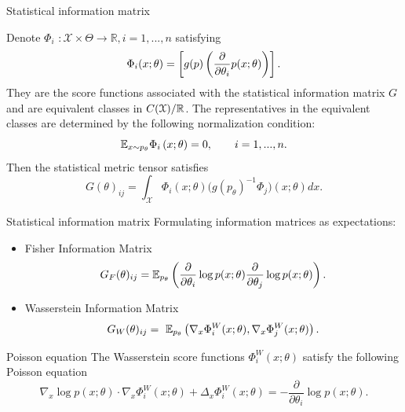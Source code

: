\documentclass{beamer}
\begin{document}
\begin{frame}{Statistical information matrix}

    \begin{definition}
Denote $\Phi_i$ $\colon \mathcal{X}\times\Theta\rightarrow \mathbb{R}, i = 1,...,n $ satisfying
$$\Phi_i(x;\theta)= \left[ g(p) \left( \frac{\partial}{\partial \theta_i}p(x;\theta) \right) \right] .$$
They are the score functions associated with the statistical information matrix $G$ and are equivalent classes in $C(\mathcal{X})/\mathbb{R}$. The representatives in the equivalent classes are determined by the following normalization condition:
\begin{equation*}\label{normalization}
    \mathbb{E}_{x \sim p_\theta} \Phi_i\left( x; \theta \right) = 0,\qquad i = 1,...,n.
\end{equation*}
Then the statistical metric tensor satisfies  
\begin{equation*}
G(\theta)_{ij}=\int_{\mathcal{X}} \Phi_i(x;\theta)\Big(g(p_\theta)^{-1}\Phi_j\Big)(x;\theta)dx.
\end{equation*}
\end{definition}
\end{frame}

\begin{frame}{Statistical information matrix}
    Formulating information matrices as expectations:
    \begin{itemize}
        \item Fisher Information Matrix
        \begin{equation*}
\begin{split}
G_F(\theta)_{ij}= \mathbb{E}_{p_\theta}\left( \frac{\partial}{\partial \theta_i}\log p(x;\theta)\frac{\partial}{\partial \theta_j}\log p(x;\theta) \right).
\end{split}
\end{equation*}
        \item Wasserstein Information Matrix
        \begin{equation*}
\begin{split}
G_W(\theta)_{ij}=\ \mathbb{E}_{p_\theta}\left( \nabla_x\Phi_i^W(x;\theta), \nabla_x\Phi_j^W(x;\theta) \right).
\end{split}
\end{equation*}
    \end{itemize}
\end{frame}

\begin{frame}{Poisson equation}
The Wasserstein score functions $\Phi^W_i(x;\theta)$ satisfy the following Poisson equation
\begin{equation*}\label{ws}
\nabla_x \log p(x;\theta)\cdot \nabla_x\Phi^W_i(x;\theta)+\Delta_x\Phi^W_i(x;\theta)=-\frac{\partial}{\partial \theta_i}\log p(x;\theta).
\end{equation*}
\end{frame}
\end{document}
